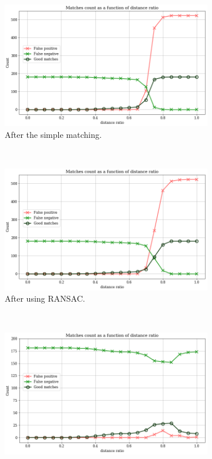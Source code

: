 \documentclass[fleqn,10pt,lineno]{wlpeerj} %
\begin{document}
\begin{figure}[H]
\centering
\begin{subfigure}{0.32\textwidth}
    \includegraphics[width=1\linewidth]{res_1.png}
    \caption{After the simple matching.}
    \label{res:1}
\end{subfigure}
~
\begin{subfigure}{0.32\textwidth}
    \includegraphics[width=1\linewidth]{res_2.png}
    \caption{After using RANSAC.}
    \label{res:2}
\end{subfigure}
~
\begin{subfigure}{0.32\textwidth}
    \includegraphics[width=1\linewidth]{res_3.png}

\end{subfigure}
\end{figure}
\end{document}
